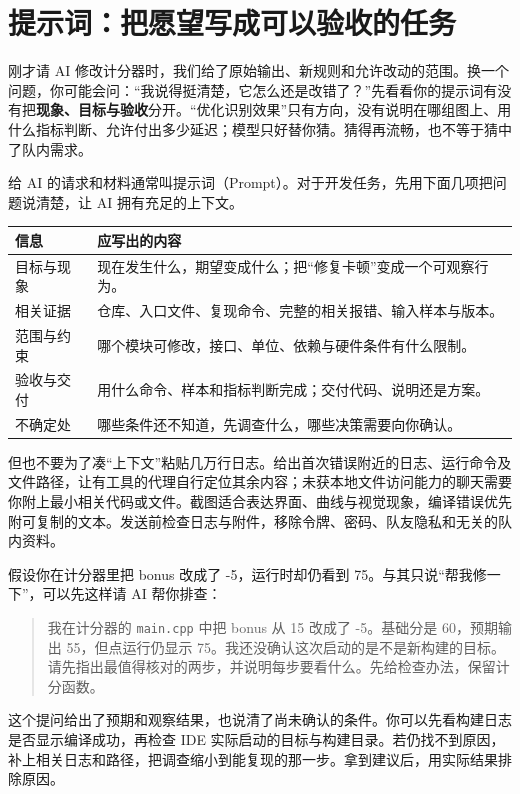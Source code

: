\section{提示词：把愿望写成可以验收的任务}
\label{sec:ai-prompts}

刚才请 AI 修改计分器时，我们给了原始输出、新规则和允许改动的范围。换一个问题，你可能会问：“我说得挺清楚，它怎么还是改错了？”先看看你的提示词有没有把\textbf{现象、目标与验收}分开。“优化识别效果”只有方向，没有说明在哪组图上、用什么指标判断、允许付出多少延迟；模型只好替你猜。猜得再流畅，也不等于猜中了队内需求。

给 AI 的请求和材料通常叫提示词（Prompt）。对于开发任务，先用下面几项把问题说清楚，让 AI 拥有充足的上下文。
\begin{center}
\begin{tabular}{p{}p{}}
\toprule
信息 & 应写出的内容 \\
\midrule
目标与现象 & 现在发生什么，期望变成什么；把“修复卡顿”变成一个可观察行为。\\
相关证据 & 仓库、入口文件、复现命令、完整的相关报错、输入样本与版本。\\
范围与约束 & 哪个模块可修改，接口、单位、依赖与硬件条件有什么限制。\\
验收与交付 & 用什么命令、样本和指标判断完成；交付代码、说明还是方案。\\
不确定处 & 哪些条件还不知道，先调查什么，哪些决策需要向你确认。\\
\bottomrule
\end{tabular}
\end{center}

但也不要为了凑“上下文”粘贴几万行日志。给出首次错误附近的日志、运行命令及文件路径，让有工具的代理自行定位其余内容；未获本地文件访问能力的聊天需要你附上最小相关代码或文件。截图适合表达界面、曲线与视觉现象，编译错误优先附可复制的文本。发送前检查日志与附件，移除令牌、密码、队友隐私和无关的队内资料。

\begin{example}
假设你在计分器里把 bonus 改成了 -5，运行时却仍看到 75。与其只说“帮我修一下”，可以先这样请 AI 帮你排查：
\begin{quote}
我在计分器的 \texttt{main.cpp} 中把 bonus 从 15 改成了 -5。基础分是 60，预期输出 55，但点运行仍显示 75。我还没确认这次启动的是不是新构建的目标。请先指出最值得核对的两步，并说明每步要看什么。先给检查办法，保留计分函数。
\end{quote}
这个提问给出了预期和观察结果，也说清了尚未确认的条件。你可以先看构建日志是否显示编译成功，再检查 IDE 实际启动的目标与构建目录。若仍找不到原因，补上相关日志和路径，把调查缩小到能复现的那一步。拿到建议后，用实际结果排除原因。
\end{example}

